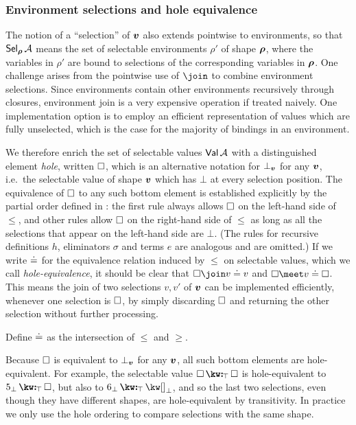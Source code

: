 \subsubsection{Environment selections and hole equivalence}

The notion of a ``selection'' of $\bm{v}$ also extends pointwise to environments, so that $\textup{\textsf{Sel}}_{\bm{\rho}}\,{\mathcal{A}}$ means the set of selectable environments $\rho'$ of shape $\bm{\rho}$, where the variables in $\rho'$ are bound to selections of the corresponding variables in $\bm{\rho}$. One challenge arises from the pointwise use of $\join$ to combine environment selections. Since environments contain other environments recursively through closures, environment join is a very expensive operation if treated naively. One implementation option is to employ an efficient representation of values which are fully unselected, which is the case for the majority of bindings in an environment.

We therefore enrich the set of selectable values $\textup{\textsf{Val}}\,{\mathcal{A}}$ with a distinguished element \emph{hole}, written $\square$, which is an alternative notation for $\bot_{\bm{v}}$ for any $\bm{v}$, i.e.~the selectable value of shape $\bm{v}$ which has $\bot$ at every selection position. The equivalence of $\square$ to any such bottom element is established explicitly by the partial order defined in : the first rule always allows $\square$ on the left-hand side of $\leq$, and other rules allow $\square$ on the right-hand side of $\leq$ as long as all the selections that appear on the left-hand side are $\bot$. (The rules for recursive definitions $h$, eliminators $\sigma$ and terms $e$ are analogous and are omitted.) If we write $\doteq$ for the equivalence relation induced by $\leq$ on selectable values, which we call \emph{hole-equivalence}, it should be clear that $\hole \join v \eq v$ and $\hole \meet v \eq \hole$. This means the join of two selections $v, v'$ of $\bm{v}$ can be implemented efficiently, whenever one selection is $\square$, by simply discarding $\square$ and returning the other selection without further processing.

\begin{definition}
   Define $\doteq$ as the intersection of $\leq$ and $\geq$.
\end{definition}

Because $\square$ is equivalent to $\bot_{\bm{v}}$ for any $\bm{v}$, all such bottom elements are hole-equivalent. For example, the selectable value $\annCons{\hole}{\hole}{\top}$ is hole-equivalent to $\annCons{5_{\bot}}{\hole}{\top}$, but also to $\annCons{6_{\bot}}{{\exNil_{\bot}}}{\top}$, and so the last two selections, even though they have different shapes, are hole-equivalent by transitivity. In practice we only use the hole ordering to compare selections with the same shape.
